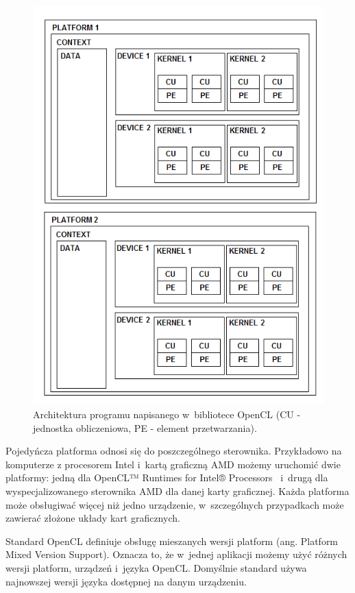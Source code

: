 \begin{figure}[H]
        \centering
                \centering
                \includegraphics[width=12cm]{rys8}
	\caption{Architektura programu napisanego w~bibliotece OpenCL (CU - jednostka obliczeniowa, PE - element przetwarzania).}
\end{figure}

Pojedyńcza platforma odnosi się do poszczególnego sterownika. Przykładowo na komputerze z procesorem Intel i~kartą graficzną AMD możemy uruchomić dwie platformy: jedną dla OpenCL™ Runtimes for Intel® Processors~\cite{b22} i~drugą dla wyspecjalizowanego sterownika AMD dla danej karty graficznej. Każda platforma może obsługiwać więcej niż jedno urządzenie, w~szczególnych przypadkach może zawierać złożone układy kart graficznych. 

Standard OpenCL definiuje obsługę mieszanych wersji platform (ang. Platform Mixed Version Support). Oznacza to, że w~jednej aplikacji możemy użyć różnych wersji platform, urządzeń i~języka OpenCL. Domyślnie standard używa najnowszej wersji języka dostępnej na danym urządzeniu.


